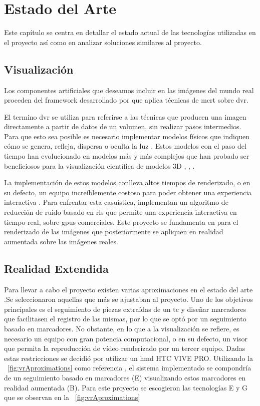 \chapter{Estado del Arte}
\label{chap:ea}
Este capítulo se centra en detallar el estado actual de las tecnologías utilizadas en el proyecto así como en analizar soluciones similares al proyecto.
\section{Visualización}
Los componentes artificiales que deseamos incluir en las imágenes del mundo real proceden del framework desarrollado por \citeauthor{Kroes2012} que aplica técnicas de \acrfull{mcrt} sobre \acrfull{dvr}.

El termino \acrshort{dvr} se utiliza para referirse a las técnicas que producen una imagen directamente a partir de datos de un volumen, sin realizar pasos intermedios. Para que esto sea posible es necesario implementar modelos físicos que indiquen cómo se genera, refleja, dispersa o oculta la luz \cite{Max1995}. Estos modelos con el paso del tiempo han evolucionado en modelos más y más complejos que han probado ser beneficiosos para la visualización científica de modelos 3D \cite{Daz2015}, \cite{Englund2016}, \cite{Lindemann2011} .

La implementación de estos modelos conlleva altos tiempos de renderizado, o en su defecto, un equipo increíblemente costoso para poder obtener una experiencia interactiva \cite{IglesiasGuitian2022}. Para enfrentar esta casuística,  \citeauthor{IglesiasGuitian2022} implementan un algoritmo de reducción de ruido basado en \acrfull{rls} que permite una experiencia interactiva en tiempo real, sobre \acrshort{gpu}s comerciales. Este proyecto se fundamenta en \cite{IglesiasGuitian2022} para el renderizado de las imágenes que posteriormente se apliquen en realidad aumentada sobre las imágenes reales.

\section{Realidad Extendida}

Para llevar a cabo el proyecto existen varias aproximaciones en el estado del arte \cite{Venkatesan2021}.Se seleccionaron aquellas que más se ajustaban al proyecto.
Uno de los objetivos principales es el seguimiento de piezas extraídas de un \acrshort{tc} y diseñar marcadores que facilitasen el registro de las mismas, por lo que se optó por un seguimiento basado en marcadores. No obstante, en lo que a la visualización se refiere, es necesario un equipo con gran potencia computacional, o en su defecto, un visor que permita la reproducción de vídeo renderizado por un tercer equipo. Dadas estas restricciones se decidió por utilizar un \acrfull{hmd} HTC VIVE PRO. Utilizando la \figurename~\ref{fig:vrAproximations} \cite{Venkatesan2021} como referencia , el sistema implementado se compondría de un seguimiento basado en marcadores (E) visualizando estos marcadores en realidad aumentada (B).
Para este proyecto se escogieron las tecnologías E y G que se observan en  la \figurename~\ref{fig:vrAproximations}

